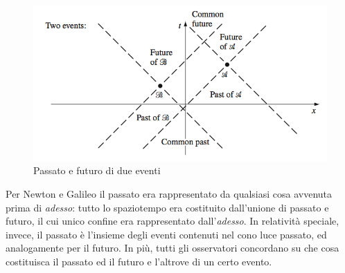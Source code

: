 \documentclass[a4paper,11pt]{book}
\theoremstyle{plain}
\theoremstyle{definition}
\begin{document}
\begin{figure}[!h]
\centering
\includegraphics[scale=0.45]{past_future}
\caption{Passato e futuro di due eventi}
\end{figure}
Per Newton e Galileo il passato era rappresentato da qualsiasi cosa avvenuta prima di \emph{adesso}: tutto lo spaziotempo era costituito dall'unione di passato e futuro, il cui unico confine era rappresentato dall'\emph{adesso}. In relatività speciale, invece, il passato è l'insieme degli eventi contenuti nel cono luce passato, ed analogamente per il futuro. In più, tutti gli osservatori concordano su che cosa costituisca il passato ed il futuro e l'altrove di un certo evento. 
\end{document}
